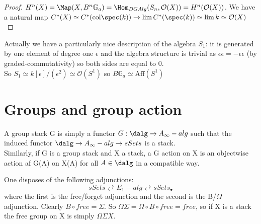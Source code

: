 \begin{proof}
$H^n(X)=\Map(X,B^n\mathbb G_a)=\Hom_{DGAlg}(S_n,\mathcal O(X))=H^n(\mathcal O(X))$. We have a natural map $C^*(X)\simeq C^*(\mathrm{col}\spec(k))\to \lim C^*(\spec(k))\simeq \lim k\simeq \mathcal O(X)$\\
\end{proof}
\begin{rmk}
Actually we have a particularly nice description of the algebra $S_1$: it is generated by one element of degree one $\epsilon$ and the algebra structure
is trivial as $\epsilon\epsilon=-\epsilon\epsilon$ (by graded-commutativity) so both sides are equal to 0.\\
So $S_1\simeq k[\epsilon]/(\epsilon^2)\simeq \mathcal O(S^1)$ so $B\mathbb G_a\simeq \mathrm{Aff}(S^1)$
\end{rmk}


\section{Groups and group action}

\begin{defin}
A group stack G is simply a functor $G:\dalg\to A_{\infty}-alg$ such that the induced functor $\dalg\to A_{\infty}-alg\to sSets$ is a stack.\\
Similarly, if G is a group stack and X a stack, a G action on X is an objectwise action af G(A) on X(A) for all $A\in\dalg$ in a compatible way.
\end{defin}

\begin{rmk}
One disposes of the following adjunctions:
$$sSets\rightleftarrows E_1-alg\rightleftarrows sSets_{\bullet}$$
where the first is the free/forget adjunction and the second is the B/$\Omega$ adjunction. Clearly $B\circ free=\Sigma$. So $\Omega\Sigma=\Omega\circ B\circ free=free$, so
if X is a stack the free group on X is simply $\Omega\Sigma X$.
\end{rmk}

